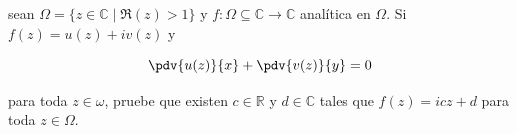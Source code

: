 \documentclass[../main.tex]{subfiles}
\begin{document}
\begin{problema}
    sean \(\Omega = \{z\in \mathbb{C} \mid \Re(z) > 1\}\) y \(f \colon \Omega
    \subseteq \mathbb{C} \to \mathbb{C}\) analítica en \(\Omega\). Si \(f(z) = u(z) +
    iv(z)\) y

    \begin{equation*}
        \pdv{u(z)}{x} + \pdv{v(z)}{y} = 0
    \end{equation*}

    para toda \(z\in \omega\), pruebe que existen \(c\in \mathbb{R}\) y
    \(d\in \mathbb{C}\)
    tales que \(f(z) = icz + d\) para toda \(z\in \Omega\).
\end{problema}
\end{document}
